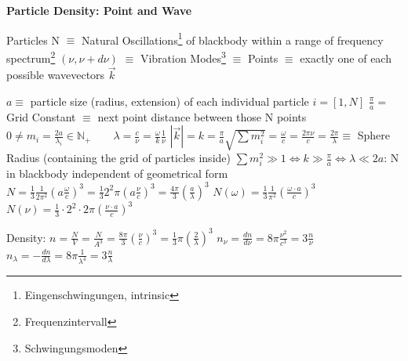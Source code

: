 \textbf{Particle Density: Point and Wave}
\vspace{1ex} \newline 

Particles N $\equiv$ Natural Oscillations\footnote{Eingenschwingungen, intrinsic} of blackbody within a range of frequency spectrum\footnote{Frequenzintervall} $(\nu,\nu+d\nu)$ $\equiv$ 
Vibration Modes\footnote{Schwingungsmoden} $\equiv$ Points $\equiv$ exactly one of each possible wavevectors $\vec{k}$  
\vspace{2ex} \newline 

\noindent
$a \equiv $ particle size (radius, extension) of each individual particle $i = \left[1,N\right]$
\vspace{2ex} \newline 
$\frac{\pi}{a} = $ Grid Constant $\equiv$ next point distance between those N points 
\vspace{2ex} \newline 
$0 \neq m_i = \frac{2a}{\lambda_i} \in \mathbb{N}_+ \qquad \lambda = \frac{c}{\nu} = \frac{\omega}{k} \frac{1}{\nu}$
\vspace{2ex} \newline 
$ |\vec{k}| = k = \frac{\pi}{a} \sqrt{ \sum m_i^2 } = \frac{\omega}{c} = \frac{2\pi\nu}{c} = \frac{2\pi}{\lambda} \equiv $ Sphere Radius (containing the grid of particles inside) 
\vspace{2ex} \newline 
$\sum m_i^2 \gg 1 \iff k \gg \frac{\pi}{a} \iff \lambda \ll 2a$: N in blackbody independent of geometrical form
\vspace{2ex} \newline 
$
N = 
\frac{1}{3} \frac{1}{2\pi^2} \left( a \frac{\omega}{c} \right)^3 = 
\frac{1}{3} 2^2\pi \left( a \frac{\nu}{c} \right)^3 = 
\frac{4\pi}{3} \left( \frac{a}{\lambda} \right)^3
$
\vspace{2ex} \newline 
$
N(\omega) = 
\frac{1}{3} \frac{1}{\pi^2} \left( \frac{\omega \cdot a}{c} \right)^3
$
\vspace{2ex} \newline 
$
N(\nu) = 
\frac{1}{3} \cdot 2^2 \cdot 2\pi \left( \frac{\nu \cdot a}{c} \right)^3
$
\vspace{2ex} \newline 


Density: 
\vspace{2ex} \newline 
$
n = \frac{N}{V} = \frac{N}{A^3} = 
\frac{8\pi}{3} \left( \frac{\nu}{c} \right)^3 = 
\frac{1}{3} \pi \left( \frac{2}{\lambda} \right)^3
$
\vspace{2ex} \newline 
$
n_{\nu} = 
\frac{dn}{d\nu} = 
8\pi \frac{\nu^2}{c^3} = 
3 \frac{n}{\nu} 
$
\vspace{2ex} \newline 
$
n_{\lambda} = 
- \frac{dn}{d\lambda} = 
8\pi \frac{1}{\lambda^4} = 
3 \frac{n}{\lambda}
$
\vspace{2ex} \newline 

